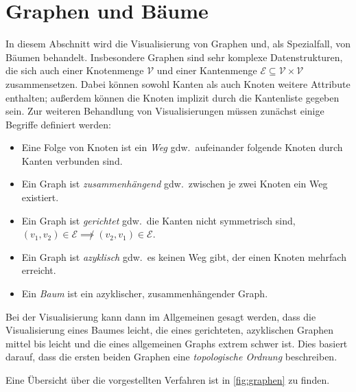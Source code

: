 \section{Graphen und Bäume}
\label{sec:visGraphen}

In diesem Abschnitt wird die Visualisierung von Graphen und, als Spezialfall, von Bäumen behandelt. Insbesondere Graphen sind sehr komplexe Datenstrukturen, die sich auch einer Knotenmenge \(\mathcal{V}\) und einer Kantenmenge \( \mathcal{E} \subseteq \mathcal{V} \times \mathcal{V} \) zusammensetzen. Dabei können sowohl Kanten als auch Knoten weitere Attribute enthalten; außerdem können die Knoten implizit durch die Kantenliste gegeben sein. Zur weiteren Behandlung von Visualisierungen müssen zunächst einige Begriffe definiert werden:
\begin{itemize}
	\item Eine Folge von Knoten ist ein \emph{Weg} gdw.~aufeinander folgende Knoten durch Kanten verbunden sind.
	\item Ein Graph ist \emph{zusammenhängend} gdw.~zwischen je zwei Knoten ein Weg existiert.
	\item Ein Graph ist \emph{gerichtet} gdw.~die Kanten nicht symmetrisch sind, \dh \( (v_1, v_2) \in \mathcal{E} \not\implies (v_2, v_1) \in \mathcal{E} \).
	\item Ein Graph ist \emph{azyklisch} gdw.~es keinen Weg gibt, der einen Knoten mehrfach erreicht.
	\item Ein \emph{Baum} ist ein azyklischer, zusammenhängender Graph.
\end{itemize}
Bei der Visualisierung kann dann im Allgemeinen gesagt werden, dass die Visualisierung eines Baumes leicht, die eines gerichteten, azyklischen Graphen mittel bis leicht und die eines allgemeinen Graphs extrem schwer ist. Dies basiert darauf, dass die ersten beiden Graphen eine \emph{topologische Ordnung} beschreiben.

Eine Übersicht über die vorgestellten Verfahren ist in \autoref{fig:graphen} zu finden.

